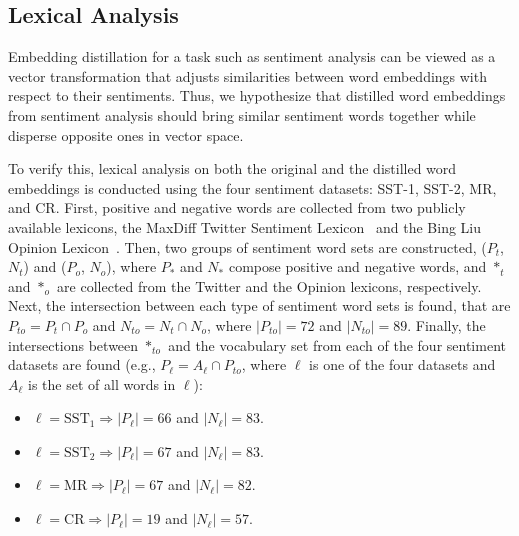 \documentclass{article}
\begin{document}
\subsection{Lexical Analysis}
\label{sssec:lexiconanalysis}


Embedding distillation for a task such as sentiment analysis can be viewed as a vector transformation that adjusts similarities between word embeddings with respect to their sentiments.
Thus, we hypothesize that distilled word embeddings from sentiment analysis should bring similar sentiment words together while disperse opposite ones in vector space.

To verify this, lexical analysis on both the original and the distilled word embeddings is conducted using the four sentiment datasets: SST-1, SST-2, MR, and CR.
First, positive and negative words are collected from two publicly available lexicons, the MaxDiff Twitter Sentiment Lexicon~\cite{kiritchenko2014sentiment} and the Bing Liu Opinion Lexicon~\cite{hu2004mining}.
Then, two groups of sentiment word sets are constructed, ($P_t$, $N_t$) and ($P_o$, $N_o$), where $P_*$ and $N_*$ compose positive and negative words, and $*_t$ and $*_o$ are collected from the Twitter and the Opinion lexicons, respectively.
Next, the intersection between each type of sentiment word sets is found, that are $P_{to} = P_t \cap P_o$ and $N_{to} = N_t \cap N_o$, where $|P_{to}| = 72$ and $|N_{to}| = 89$.
Finally, the intersections between $*_{to}$ and the vocabulary set from each of the four sentiment datasets are found (e.g., $P_{\ell} = A_{\ell} \cap P_{to}$, where $\ell$ is one of the four datasets and $A_{\ell}$ is the set of all words in $\ell$):


\begin{itemize}
	\item $\ell = \mathrm{SST}_1 \Rightarrow |P_{\ell}| = 66$ and $|N_{\ell}| = 83$.
    \item $\ell = \mathrm{SST}_2 \Rightarrow |P_{\ell}| = 67$ and $|N_{\ell}| = 83$.
    \item $\ell = \mathrm{MR} \Rightarrow |P_{\ell}| = 67$ and $|N_{\ell}| = 82$.
    \item $\ell = \mathrm{CR} \Rightarrow |P_{\ell}| = 19$ and $|N_{\ell}| = 57$.
\end{itemize}
\end{document}
